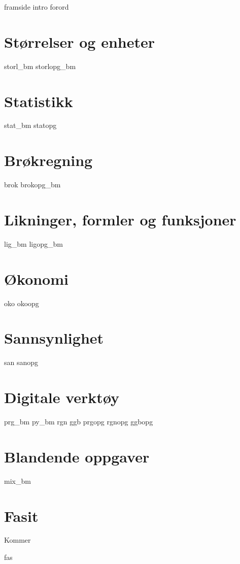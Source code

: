 




{framside}
{intro}
{forord}

\tableofcontents

\chapter{Størrelser og enheter \label{Storlogenh}}
\newpage
{storl_bm}
\opgt
{storlopg_bm}

\chapter{Statistikk \label{Statistikk}}
\newpage
{stat_bm}
{statopg}

\chapter{Brøkregning \label{Br}}
\newpage
{brok}
\newpage
{brokopg_bm}

\chapter{Likninger, formler og funksjoner \label{Lig}}
\newpage
{lig_bm}
{ligopg_bm}

\chapter{Økonomi \label{Oko}}
\newpage
{oko}
{okoopg}

\chapter{Sannsynlighet \label{San}} 
\newpage
{san}
{sanopg}

\chapter{Digitale verktøy}
{prg_bm}
{py_bm}
{rgn}	
{ggb}	
\opgt
{prgopg}
{rgnopg}	
{ggbopg}	

\chapter{Blandende oppgaver}
{mix_bm}



\chapter*{Fasit}
Kommer

{fas}






